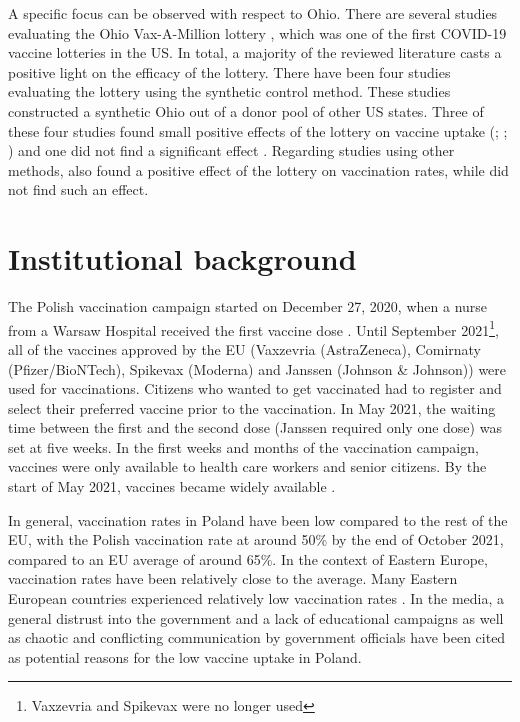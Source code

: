 \documentclass{scrbook}
\begin{document}
A specific focus can be observed with respect to Ohio. There are several
studies evaluating the Ohio Vax-A-Million lottery
\parencite{ohio_department_of_health_ohio_2021}, which was one of the
first COVID-19 vaccine lotteries in the US. In total, a majority of the
reviewed literature casts a positive light on the efficacy of the
lottery. There have been four studies evaluating the lottery using the
synthetic control method. These studies constructed a synthetic Ohio out
of a donor pool of other US states. Three of these four studies found
small positive effects of the lottery on vaccine uptake
(\cite{brehm_ohio_2022}; \cite{barber_conditional_2022};
\cite{sehgal_impact_2021}) and one did not find a significant effect
\parencite{lang_did_2022}. Regarding studies using other methods,
\textcite{mallow_covid-19_2022} also found a positive effect of the
lottery on vaccination rates, while \textcite{walkey_lottery-based_2021}
did not find such an effect.

\section{Institutional background}

The Polish vaccination campaign started on December 27, 2020, when a
nurse from a Warsaw Hospital received the first vaccine dose
\parencite{waligora_how_2021}. Until September
2021\footnote{Vaxzevria and Spikevax were no longer used}, all of the
vaccines approved by the EU (Vaxzevria (AstraZeneca), Comirnaty
(Pfizer/BioNTech), Spikevax (Moderna) and Janssen (Johnson \& Johnson))
were used for vaccinations. Citizens who wanted to get vaccinated had to
register and select their preferred vaccine prior to the vaccination. In
May 2021, the waiting time between the first and the second dose
(Janssen required only one dose) was set at five weeks. In the first
weeks and months of the vaccination campaign, vaccines were only
available to health care workers and senior citizens. By the start of
May 2021, vaccines became widely available
\parencite{koschalka_poland_2021}.

In general, vaccination rates in Poland have been low compared to the
rest of the EU, with the Polish vaccination rate at around 50\% by the
end of October 2021, compared to an EU average of around 65\%. In the
context of Eastern Europe, vaccination rates have been relatively close
to the average. Many Eastern European countries experienced relatively
low vaccination rates \parencite{mathieu_global_2021}. In the media, a
general distrust into the government and a lack of educational campaigns
\parencite{vaccines_today_polands_2021} as well as chaotic and
conflicting communication by government officials
\parencite{wanat_polands_2021} have been cited as potential reasons for
the low vaccine uptake in Poland.
\end{document}
